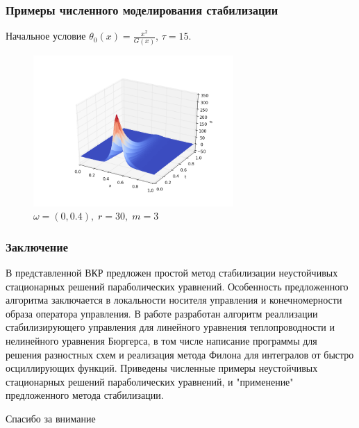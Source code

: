 \documentclass{beamer}
\begin{document}
\begin{frame}
\frametitle{Примеры численного моделирования стабилизации}

Начальное условие $\theta_0(x) = \frac{x^2}{G(x)}$, $\tau = 15$.

\begin{figure}[H]
 \centering
  \includegraphics[width=3.0in]{re_x2_s15}
  \caption{$\omega = (0, 0.4), \; r = 30, \; m = 3$}
  \label{fig:test2}
\end{figure}

\end{frame}


\begin{frame}
\frametitle{Заключение}

В представленной ВКР предложен простой метод стабилизации неустойчивых
стационарных решений параболических уравнений. Особенность предложенного
алгоритма заключается в локальности носителя управления и конечномерности образа
оператора управления. В работе разработан алгоритм реаллизации стабилизирующего
управления для линейного уравнения теплопроводности и нелинейного уравнения
Бюргерса, в том числе написание программы для решения разностных схем и
реализация метода Филона для интегралов от быстро осциллирующих функций.
Приведены численные примеры неустойчивых стационарных решений параболических
уравнений, и "применение" предложенного метода стабилизации.

\end{frame}

\begin{frame}
	\begin{center}
	\Huge Спасибо за внимание
	\end{center}
\end{frame}
\end{document}
